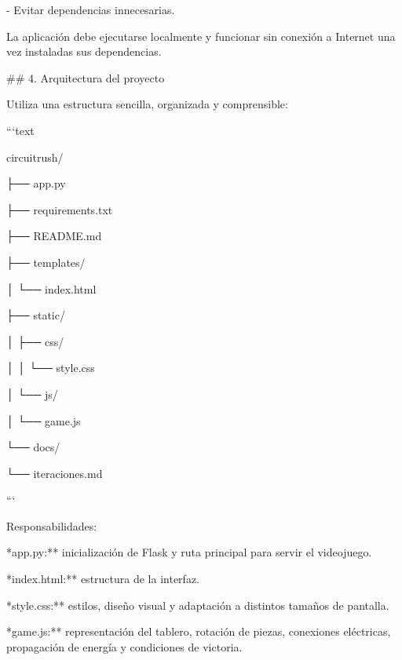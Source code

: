 \noindent - Evitar dependencias innecesarias.\par
\par\smallskip
\noindent La aplicación debe ejecutarse localmente y funcionar sin conexión a Internet una vez instaladas sus dependencias.\par
\par\smallskip
\noindent \#\# 4. Arquitectura del proyecto\par
\par\smallskip
\noindent Utiliza una estructura sencilla, organizada y comprensible:\par
\par\smallskip
\noindent ```text\par
\noindent circuitrush/\par
\noindent ├── app.py\par
\noindent ├── requirements.txt\par
\noindent ├── README.md\par
\noindent ├── templates/\par
\noindent │   └── index.html\par
\noindent ├── static/\par
\noindent │   ├── css/\par
\noindent │   │   └── style.css\par
\noindent │   └── js/\par
\noindent │       └── game.js\par
\noindent └── docs/\par
\noindent     └── iteraciones.md\par
\noindent ```\par
\par\smallskip
\noindent Responsabilidades:\par
\par\smallskip
\noindent **app.py:** inicialización de Flask y ruta principal para servir el videojuego.\par
\par\smallskip
\noindent **index.html:** estructura de la interfaz.\par
\par\smallskip
\noindent **style.css:** estilos, diseño visual y adaptación a distintos tamaños de pantalla.\par
\par\smallskip
\noindent **game.js:** representación del tablero, rotación de piezas, conexiones eléctricas, propagación de energía y condiciones de victoria.\par
